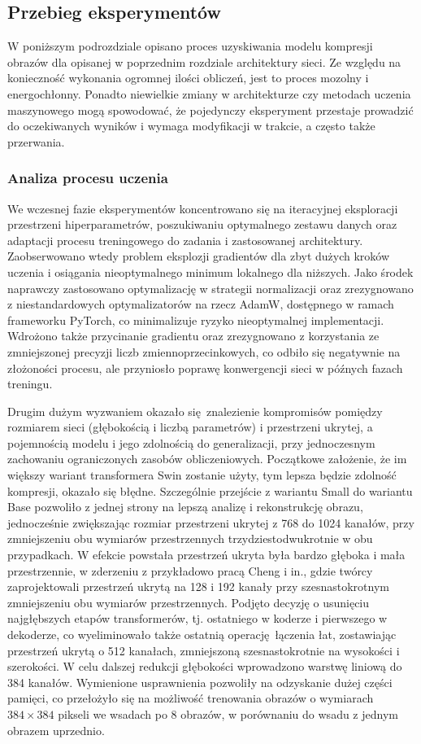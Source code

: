 \subsection{Przebieg eksperymentów}
W poniższym podrozdziale opisano proces uzyskiwania modelu kompresji obrazów dla opisanej w poprzednim rozdziale architektury sieci. Ze względu na konieczność wykonania ogromnej ilości obliczeń, jest to proces mozolny i energochłonny. Ponadto niewielkie zmiany w architekturze czy metodach uczenia maszynowego mogą spowodować, że pojedynczy eksperyment przestaje prowadzić do oczekiwanych wyników i wymaga modyfikacji w trakcie, a często także przerwania.

\subsubsection{Analiza procesu uczenia} \label{proces-uczenia}
We wczesnej fazie eksperymentów koncentrowano się na iteracyjnej eksploracji przestrzeni hiperparametrów, poszukiwaniu optymalnego zestawu danych oraz adaptacji procesu treningowego do zadania i zastosowanej architektury. Zaobserwowano wtedy problem eksplozji gradientów dla zbyt dużych kroków uczenia i osiągania nieoptymalnego minimum lokalnego dla niższych. Jako środek naprawczy zastosowano optymalizację w strategii normalizacji oraz zrezygnowano z niestandardowych optymalizatorów na rzecz AdamW, dostępnego w ramach frameworku PyTorch, co minimalizuje ryzyko nieoptymalnej implementacji. Wdrożono także przycinanie gradientu oraz zrezygnowano z korzystania ze zmniejszonej precyzji liczb zmiennoprzecinkowych, co odbiło się negatywnie na złożoności procesu, ale przyniosło poprawę konwergencji sieci w późnych fazach treningu.

Drugim dużym wyzwaniem okazało się znalezienie kompromisów pomiędzy rozmiarem sieci (głębokością i liczbą parametrów) i przestrzeni ukrytej, a pojemnością modelu i jego zdolnością do generalizacji, przy jednoczesnym zachowaniu ograniczonych zasobów obliczeniowych. Początkowe założenie, że im większy wariant transformera Swin zostanie użyty, tym lepsza będzie zdolność kompresji, okazało się błędne. Szczególnie przejście z wariantu Small do wariantu Base pozwoliło z jednej strony na lepszą analizę i rekonstrukcję obrazu, jednocześnie zwiększając rozmiar przestrzeni ukrytej z 768 do 1024 kanałów, przy zmniejszeniu obu wymiarów przestrzennych trzydziestodwukrotnie w obu przypadkach. W efekcie powstała przestrzeń ukryta była bardzo głęboka i mała przestrzennie, w zderzeniu z przykładowo pracą Cheng i in., gdzie twórcy zaprojektowali przestrzeń ukrytą na 128 i 192 kanały przy szesnastokrotnym zmniejszeniu obu wymiarów przestrzennych. Podjęto decyzję o usunięciu najgłębszych etapów transformerów, tj. ostatniego w koderze i pierwszego w dekoderze, co wyeliminowało także ostatnią operację łączenia łat, zostawiając przestrzeń ukrytą o 512 kanałach, zmniejszoną szesnastokrotnie na wysokości i szerokości. W celu dalszej redukcji głębokości wprowadzono warstwę liniową do 384 kanałów. Wymienione usprawnienia pozwoliły na odzyskanie dużej części pamięci, co przełożyło się na możliwość trenowania obrazów o wymiarach \(384 \times 384\) pikseli we wsadach po 8 obrazów, w porównaniu do wsadu z jednym obrazem uprzednio.

